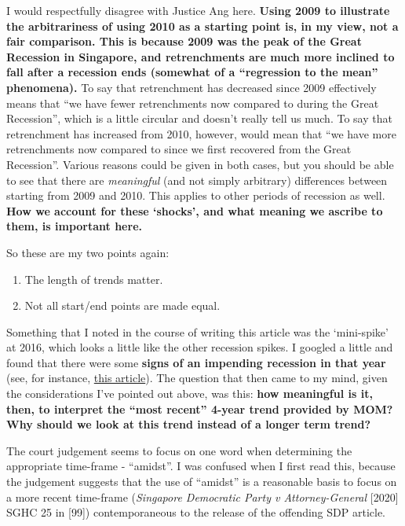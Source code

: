 \documentclass[
  openany]{book}
\providecommand{\tightlist}{%
  \setlength{\itemsep}{0pt}\setlength{\parskip}{0pt}}
\begin{document}
I would respectfully disagree with Justice Ang here. \textbf{Using 2009 to illustrate the arbitrariness of using 2010 as a starting point is, in my view, not a fair comparison. This is because 2009 was the peak of the Great Recession in Singapore, and retrenchments are much more inclined to fall after a recession ends (somewhat of a ``regression to the mean'' phenomena).} To say that retrenchment has decreased since 2009 effectively means that ``we have fewer retrenchments now compared to during the Great Recession'', which is a little circular and doesn't really tell us much. To say that retrenchment has increased from 2010, however, would mean that ``we have more retrenchments now compared to since we first recovered from the Great Recession''. Various reasons could be given in both cases, but you should be able to see that there are \emph{meaningful} (and not simply arbitrary) differences between starting from 2009 and 2010. This applies to other periods of recession as well. \textbf{How we account for these `shocks', and what meaning we ascribe to them, is important here.}

So these are my two points again:

\begin{enumerate}
\def\labelenumi{\arabic{enumi}.}
\tightlist
\item
  The length of trends matter.
\item
  Not all start/end points are made equal.
\end{enumerate}

Something that I noted in the course of writing this article was the `mini-spike' at 2016, which looks a little like the other recession spikes. I googled a little and found that there were some \textbf{signs of an impending recession in that year} (see, for instance, \href{https://www.cnbc.com/2016/11/23/is-singapores-economy-headed-for-a-technical-recession.html}{this article}). The question that then came to my mind, given the considerations I've pointed out above, was this: \textbf{how meaningful is it, then, to interpret the ``most recent'' 4-year trend provided by MOM? Why should we look at this trend instead of a longer term trend?}

The court judgement seems to focus on one word when determining the appropriate time-frame - ``amidst''. I was confused when I first read this, because the judgement suggests that the use of ``amidst'' is a reasonable basis to focus on a more recent time-frame (\emph{Singapore Democratic Party v Attorney-General} {[}2020{]} SGHC 25 in {[}99{]}) contemporaneous to the release of the offending SDP article.
\end{document}
